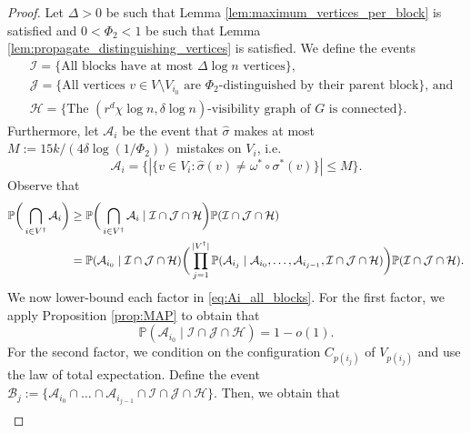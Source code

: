 \documentclass{article}
\renewcommand{\P}{\mathbb{P}}
\newcommand{\1}{\mathbbm{1}}
\newcommand{\calA}{\mathcal{A}}
\newcommand{\calB}{\mathcal{B}}
\newcommand{\calH}{\mathcal{H}}
\newcommand{\calI}{\mathcal{I}}
\newcommand{\calJ}{\mathcal{J}}
\theoremstyle{definition}
\theoremstyle{plain}
\begin{document}
\begin{proof}
    Let $\Delta > 0$ be such that Lemma \ref{lem:maximum_vertices_per_block} is satisfied and $0 < \Phi_2 < 1$ be such that Lemma \ref{lem:propagate_distinguishing_vertices} is satisfied. We define the events
    \begin{equation*}
    \begin{aligned}
        &\calI = \text{\{All blocks have at most $\Delta \log n$ vertices\},} \\
        &\calJ = \text{\{All vertices $v \in V \setminus V_{i_0}$ are $\Phi_2$-distinguished by their parent block\}, and} \\
        &\calH = \text{\{The $(r^d \chi \log n, \delta \log n)$-visibility graph of $G$ is connected\}}.
    \end{aligned}
    \end{equation*}
    Furthermore, let $\calA_i$ be the event that $\hat{\sigma}$ makes at most $M := 15k/(4\delta \log(1/\Phi_2))$ mistakes on $V_i$, i.e.
    \begin{equation*}
        \calA_i = \Big\{ |\{ v \in V_i: \hat{\sigma}(v) \neq \omega^* \circ  \sigma^*(v) \}| \leq M \Big\}.
    \end{equation*}
    Observe that
    \begin{align}
    \label{eq:Ai_all_blocks}
        \P\bigg( \bigcap_{i \in V^\dagger} \calA_i \bigg) &\geq \P\bigg( \bigcap_{i \in V^\dagger} \calA_i \mid \calI \cap \calJ \cap \calH \bigg) \P(\calI \cap \calJ \cap \calH) \notag \\
        &= \P(\calA_{i_0} \mid \calI \cap \calJ \cap \calH) \bigg( \prod_{j=1}^{|V^\dagger|} \P(\calA_{i_j} \mid \calA_{i_0}, \ldots, \calA_{i_{j-1}}, \calI \cap \calJ \cap \calH) \bigg) \P(\calI \cap \calJ \cap \calH).
    \end{align}
    We now lower-bound each factor in \eqref{eq:Ai_all_blocks}. For the first factor, we apply Proposition \ref{prop:MAP} to obtain that 
    \begin{equation}
    \label{eq:Ai_first_block}
        \P(\calA_{i_0} \mid \calI \cap \calJ \cap \calH) = 1 - o(1).
    \end{equation}
    For the second factor, we condition on the configuration $C_{p(i_j)}$ of $V_{p(i_j)}$ and use the law of total expectation. Define the event $\calB_j := \{\calA_{i_0} \cap \ldots \cap \calA_{i_{j-1}} \cap \calI \cap \calJ \cap \calH\}$. Then, we obtain that
    \begin{equation*}
    \begin{aligned}

\end{aligned}
\end{equation*}
\end{proof}
\end{document}
